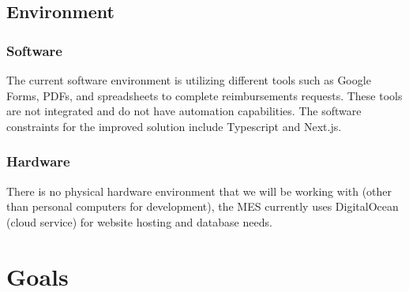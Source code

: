 \documentclass{article}
\begin{document}
\subsection{Environment}


\subsubsection{Software}
The current software environment is utilizing different tools such as Google Forms, PDFs, and spreadsheets to complete reimbursements requests. These tools are not integrated and do not have automation capabilities. The software constraints for the improved solution include Typescript and Next.js. 

\subsubsection{Hardware}
There is no physical hardware environment that we will be working with (other than personal computers for development), the MES currently uses DigitalOcean (cloud service) for website hosting and database needs.

\section{Goals}
\end{document}
